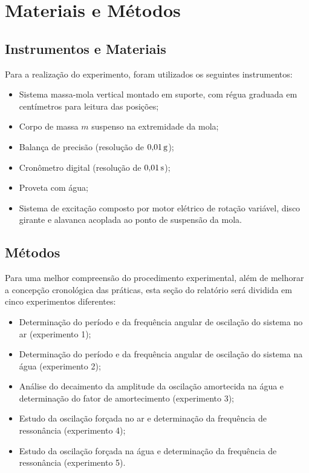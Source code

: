 \section{Materiais e Métodos}

\subsection{Instrumentos e Materiais}

Para a realização do experimento, foram utilizados os seguintes instrumentos:
\begin{itemize}
    \item Sistema massa-mola vertical montado em suporte, com régua graduada em centímetros para leitura das posições;
    \item Corpo de massa $m$ suspenso na extremidade da mola;
    \item Balança de precisão (resolução de $0{,}01\,\mathrm{g}$);
    \item Cronômetro digital (resolução de $0{,}01\,\mathrm{s}$);
    \item Proveta com água;
    \item Sistema de excitação composto por motor elétrico de rotação variável, disco girante e alavanca acoplada ao ponto de suspensão da mola.
\end{itemize}

\subsection{Métodos}

Para uma melhor compreensão do procedimento experimental, além de melhorar a concepção cronológica das práticas, esta seção do relatório será dividida em cinco experimentos diferentes:
\begin{itemize}
    \item Determinação do período e da frequência angular de oscilação do sistema no ar (experimento 1);
    \item Determinação do período e da frequência angular de oscilação do sistema na água (experimento 2);
    \item Análise do decaimento da amplitude da oscilação amortecida na água e determinação do fator de amortecimento (experimento 3);
    \item Estudo da oscilação forçada no ar e determinação da frequência de ressonância (experimento 4);
    \item Estudo da oscilação forçada na água e determinação da frequência de ressonância (experimento 5).
\end{itemize}

